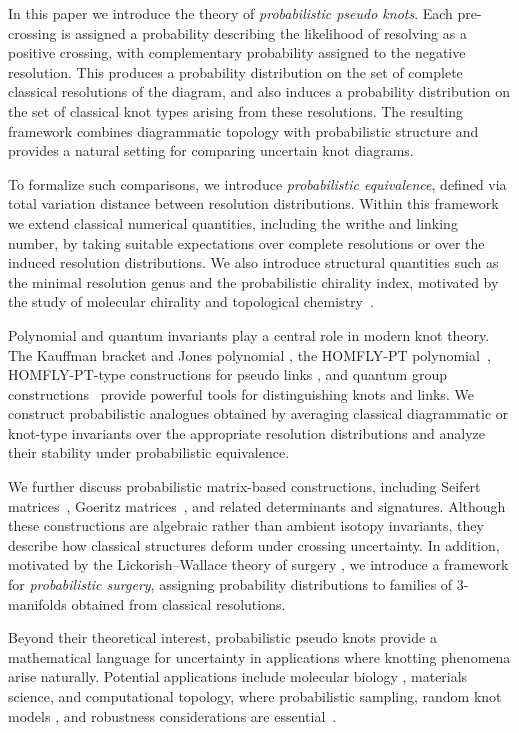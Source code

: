 \documentclass[a4paper, reqno, 12pt]{amsart}
\theoremstyle{plain}
\theoremstyle{definition}
\begin{document}
In this paper we introduce the theory of \emph{probabilistic pseudo knots}. Each pre-crossing is assigned a probability describing the likelihood of resolving as a positive crossing, with complementary probability assigned to the negative resolution. This produces a probability distribution on the set of complete classical resolutions of the diagram,
and also induces a probability distribution on the set of classical knot types arising from these resolutions. The resulting framework combines diagrammatic topology with probabilistic structure and provides a natural setting for comparing uncertain knot diagrams.

To formalize such comparisons, we introduce \emph{probabilistic equivalence}, defined via total variation distance between resolution distributions. Within this framework we extend classical numerical quantities, including the writhe and linking number, by taking suitable expectations over complete resolutions or over the induced resolution distributions. We also introduce structural quantities such as the minimal resolution genus and the
probabilistic chirality index, motivated by the study of molecular chirality and topological chemistry~\cite{F}.

Polynomial and quantum invariants play a central role in modern knot theory. The Kauffman bracket and Jones polynomial \cites{Kauffman,Jones,LK,LK1,WRT}, the HOMFLY-PT polynomial~\cite{HOMFLY}, HOMFLY-PT-type constructions for pseudo links \cite{D1}, and quantum group constructions~\cite{RT} provide powerful tools for distinguishing knots and links. We construct probabilistic analogues obtained by averaging classical diagrammatic or knot-type invariants over the appropriate resolution distributions and analyze their stability under probabilistic equivalence.

We further discuss probabilistic matrix-based constructions, including Seifert matrices~\cite{Seifert}, Goeritz matrices~\cites{Goeritz,GL}, and related determinants and signatures. Although these constructions are algebraic rather than ambient isotopy invariants, they describe how classical structures deform under crossing uncertainty. In addition, motivated by the Lickorish--Wallace theory of surgery \cites{Lickorish,Wallace}, we introduce a framework for \emph{probabilistic surgery}, assigning probability distributions to families of \(3\)-manifolds obtained from classical resolutions.

Beyond their theoretical interest, probabilistic pseudo knots provide a mathematical language for uncertainty in applications where knotting phenomena arise naturally. Potential applications include molecular biology \cites{B,F}, materials science, and computational topology, where
probabilistic sampling, random knot models \cite{SumnersWhittington1988}, and robustness considerations are essential~\cite{EZHLN}.
\end{document}
